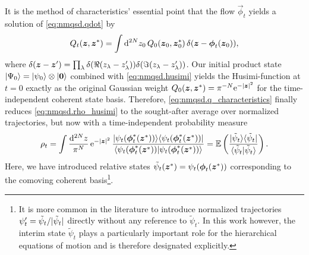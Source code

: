 It is the method of characteristics' essential point that the flow $\vec\phi_t$ yields a solution of \autoref{eq:nmqsd.qdot} by
\begin{equation}
  Q_t(\boldsymbol{z}, {\boldsymbol{z}}^*) = \int \mathrm{d}^{2N}z_0 \, Q_0(\boldsymbol{z}_0, {\boldsymbol{z}}^*_0) \, \delta(\boldsymbol{z} - \boldsymbol{\phi}_t(\boldsymbol{z}_0)),
  \label{eq:nmqsd.q_characteristics}
\end{equation}
where $\delta(\boldsymbol{z} - \boldsymbol{z}') = \prod_\lambda \delta(\Re(z_\lambda - z_\lambda')) \delta(\Im(z_\lambda - z_\lambda'))$.
Our initial product state $| \Psi_0 \rangle = | \psi_0 \rangle \otimes | \boldsymbol{0} \rangle$ combined with \autoref{eq:nmqsd.husimi} yields the Husimi-function at $t=0$ exactly as the original Gaussian weight $Q_0(\zz, \cc\zz) = \pi^{-N} \exp[-\abs{\zz}^2]$ for the time-independent coherent state basis.
Therefore, \autoref{eq:nmqsd.q_characteristics} finally reduces \autoref{eq:nmqsd.rho_husimi} to the sought-after average over normalized trajectories, but now with a time-independent probability measure
\begin{equation}
  \rho_t = \int \frac{\mathrm{d}^{2N}z}{\pi^N} \, \exp[-\abs{\zz}^2] \, \frac{\ket\psitphi \bra\psitphi}{\braket{\psitphi}{\psitphi}}
         = \E[ \frac{\ket{\tilde\psi_t}\bra{\tilde\psi_t}}{\braket{\tilde\psi_t}{\tilde\psi_t}}].
  \label{eq:nmqsd.reduced_matrix_comoving}
\end{equation}
Here, we have introduced relative states $\tilde\psi_t({\boldsymbol{z}}^*) = \psi_t(\boldsymbol{\phi}_t({\boldsymbol{z}}^*))$ corresponding to the comoving coherent basis\footnote{%
  It is more common in the literature to introduce normalized trajectories $\psi'_t = \tilde\psi_t / \vert \tilde\psi_t \vert$ directly without any reference to $\tilde\psi_t$.
  In this work however, the interim state $\tilde\psi_t$ plays a particularly important role for the hierarchical equations of motion and is therefore designated explicitly.
}.\\



